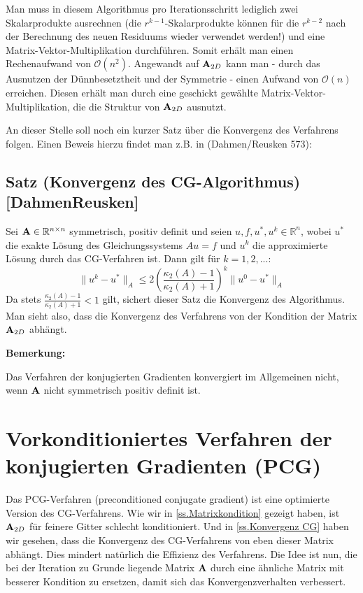 Man muss in diesem Algorithmus pro Iterationsschritt lediglich zwei Skalarprodukte ausrechnen (die $r^{k-1}$-Skalarprodukte können für die $r^{k-2}$ nach der Berechnung des neuen Residuums wieder verwendet werden!) und eine Matrix-Vektor-Multiplikation durchführen. Somit erhält man einen Rechenaufwand von $\mathcal{O}(n^{2})$. Angewandt auf ${\textbf{A}}_{2D}$ kann man - durch das Ausnutzen der Dünnbesetztheit und der Symmetrie - einen Aufwand von $\mathcal{O}(n)$ erreichen. Diesen erhält man durch eine geschickt gewählte Matrix-Vektor-Multiplikation, die die Struktur von ${\textbf{A}}_{2D}$ ausnutzt.

An dieser Stelle soll noch ein kurzer Satz über die Konvergenz des Verfahrens folgen. Einen Beweis hierzu findet man z.B. in (Dahmen/Reusken 573):

\subsection{Satz (Konvergenz des CG-Algorithmus) [DahmenReusken]}\label{ss.Konvergenz CG}

Sei ${\textbf{A}} \in \mathbb{R}^{n \times n}$ symmetrisch, positiv definit und seien $u,f,u^{*},u^{k} \in \mathbb{R}^{n}$, wobei $u^{*}$ die exakte Lösung des Gleichungssystems $Au = f$ und $u^{k}$ die approximierte Lösung durch das CG-Verfahren ist. Dann gilt für $k = 1,2,...$:
\begin{equation}
\| u^{k} - u^{*} \|_{A} \le 2 \left( \frac {\kappa_{2} (A) - 1} {\kappa_{2} (A) + 1} \right)^{k} \| u^{0} - u^{*} \|_{A}
\end{equation}
Da stets $\frac {\kappa_{2} (A) - 1} {\kappa_{2} (A) + 1} < 1$ gilt, sichert dieser Satz die Konvergenz des Algorithmus. Man sieht also, dass die Konvergenz des Verfahrens von der Kondition der Matrix ${\textbf{A}}_{2D}$ abhängt.

\textbf{Bemerkung:}

Das Verfahren der konjugierten Gradienten konvergiert im Allgemeinen nicht, wenn ${\textbf{A}}$ nicht symmetrisch positiv definit ist.

\section{Vorkonditioniertes Verfahren der konjugierten Gradienten (PCG)}\label{s.PCG}

Das PCG-Verfahren (preconditioned conjugate gradient) ist eine optimierte Version des CG-Verfahrens. Wie wir in \autoref{ss.Matrixkondition} gezeigt haben, ist ${\textbf{A}}_{2D}$ für feinere Gitter schlecht konditioniert. Und in \autoref{ss.Konvergenz CG} haben wir gesehen, dass die Konvergenz des CG-Verfahrens von eben dieser Matrix abhängt. Dies mindert natürlich die Effizienz des Verfahrens. Die Idee ist nun, die bei der Iteration zu Grunde liegende Matrix ${\textbf{A}}$ durch eine ähnliche Matrix mit besserer Kondition zu ersetzen, damit sich das Konvergenzverhalten verbessert.

